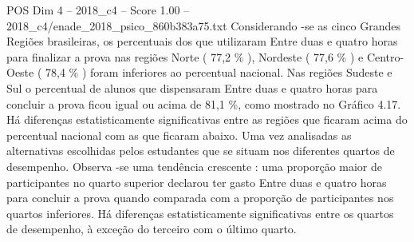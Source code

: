 \begin{textsample}{POS Dim 4 – 2018\_c4 – Score 1.00 – 2018\_c4/enade\_2018\_psico\_860b383a75.txt}
Considerando -se as cinco Grandes Regiões brasileiras, os percentuais dos que utilizaram Entre duas e quatro horas para finalizar a prova nas regiões Norte ( 77,2 \% ), Nordeste ( 77,6 \% ) e Centro-Oeste ( 78,4 \% ) foram inferiores ao percentual nacional.
Nas regiões Sudeste e Sul o percentual de alunos que dispensaram Entre duas e quatro horas para concluir a prova ficou igual ou acima de 81,1 \%, como mostrado no Gráfico 4.17.
Há diferenças estatisticamente significativas entre as regiões que ficaram acima do percentual nacional com as que ficaram abaixo.
Uma vez analisadas as alternativas escolhidas pelos estudantes que se situam nos diferentes quartos de desempenho.
Observa -se uma tendência crescente : uma proporção maior de participantes no quarto superior declarou ter gasto Entre duas e quatro horas para concluir a prova quando comparada com a proporção de participantes nos quartos inferiores.
Há diferenças estatisticamente significativas entre os quartos de desempenho, à exceção do terceiro com o último quarto.

\end{textsample}
